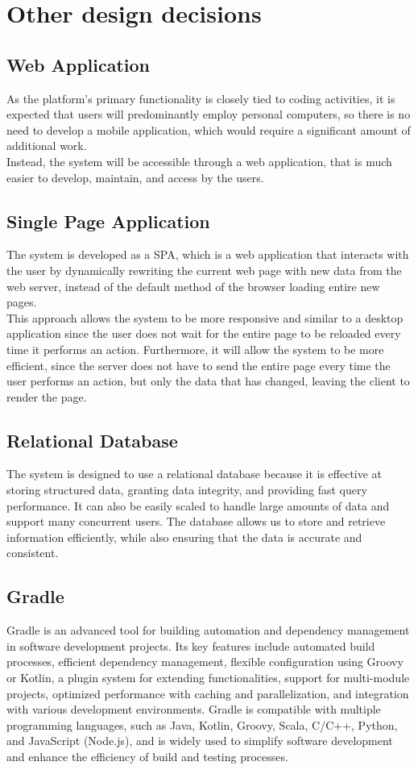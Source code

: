 \section{Other design decisions}
\subsection{Web Application}
As the platform's primary functionality is closely tied to coding activities, it is expected that users will predominantly employ personal computers, so there is no need to develop a mobile application, which would require a significant amount of additional work. \\
Instead, the system will be accessible through a web application, that is much easier to develop, maintain, and access by the users.

\subsection{Single Page Application}
The system is developed as a SPA, which is a web application that interacts with the user by dynamically rewriting the current web page with new data from the web server, instead of the default method of the browser loading entire new pages.\\
This approach allows the system to be more responsive and similar to a desktop application since the user does not wait for the entire page to be reloaded every time it performs an action. 
Furthermore, it will allow the system to be more efficient, since the server does not have to send the entire page every time the user performs an action, but only the data that has changed, leaving the client to render the page.

\subsection{Relational Database}
The system is designed to use a relational database because it is effective at storing structured data, granting data integrity, and providing fast query performance. 
It can also be easily scaled to handle large amounts of data and support many concurrent users. 
The database allows us to store and retrieve information efficiently, while also ensuring that the data is accurate and consistent.

\subsection{Gradle}
Gradle is an advanced tool for building automation and dependency management in software development projects. 
Its key features include automated build processes, efficient dependency management, flexible configuration using Groovy or Kotlin, a plugin system for extending functionalities, support for multi-module projects, optimized performance with caching and parallelization, and integration with various development environments. 
Gradle is compatible with multiple programming languages, such as Java, Kotlin, Groovy, Scala, C/C++, Python, and JavaScript (Node.js), and is widely used to simplify software development and enhance the efficiency of build and testing processes.
